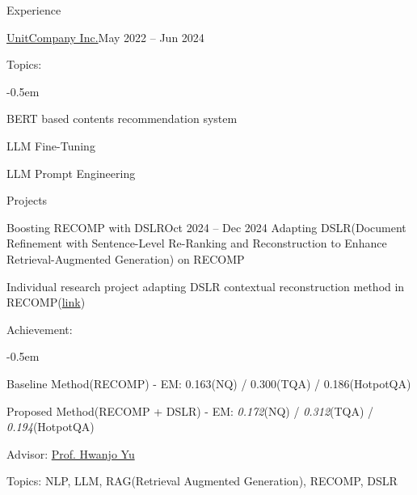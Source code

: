 \documentclass{resume}
\begin{document}
\begin{rSection}{Experience}
\begin{rSubsection}{\href{https://unitcompany.co.kr}{UnitCompany Inc.}}{May 2022 -- Jun 2024}
        \item Topics:

        \vspace{-0.5em}
        \begin{list}{--}{}
            \itemsep -0.5em

            \item BERT based contents recommendation system

            \item LLM Fine-Tuning

            \item LLM Prompt Engineering
        \end{list}
    \end{rSubsection}
\end{rSection}

\begin{rSection}{Projects}
    \begin{rSubsection}{Boosting RECOMP with DSLR}{Oct 2024 -- Dec 2024}
        Adapting DSLR(Document Refinement with Sentence-Level Re-Ranking and Reconstruction to Enhance Retrieval-Augmented Generation) on RECOMP

        \item Individual research project adapting DSLR contextual reconstruction method in RECOMP(\href{https://github.com/minsusun/boosting-recomp-with-dslr}{link})

        \item Achievement:
        \vspace{-0.5em}
        \begin{list}{--}{\setlength{\rightmargin}{1.5em}}
            \itemsep -0.5em

            \item Baseline Method(RECOMP) - EM: 0.163(NQ) / 0.300(TQA) / 0.186(HotpotQA)

            \item Proposed Method(RECOMP + DSLR) - EM: \emph{0.172}(NQ) / \emph{0.312}(TQA) / \emph{0.194}(HotpotQA)
        \end{list}

        \item Advisor: \href{https://sites.google.com/view/postechdi/member/faculty}{Prof. Hwanjo Yu}

        \item Topics: NLP, LLM, RAG(Retrieval Augmented Generation), RECOMP, DSLR
    \end{rSubsection}


\end{rSection}
\end{document}
